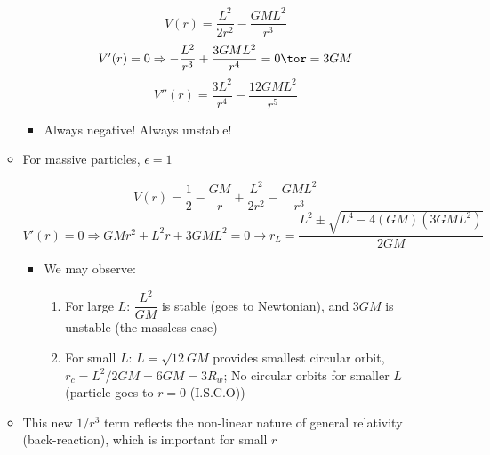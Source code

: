 \begin{itemize}
\begin{itemize}
        $$V(r)=\frac{L^2}{2r^2}-\frac{GML^2}{r^3}$$
        $$V'(r)=0\Rightarrow-\frac{L^2}{r^3}+\frac{3GML^2}{r^4}=0\tor=3GM$$
        $$V''(r)=\frac{3L^2}{r^4}-\frac{12GML^2}{r^5}$$

        \begin{itemize}

          \item Always negative! Always unstable!

        \end{itemize}

      \item For massive particles, $\epsilon=1$

        $$V(r)=\frac{1}{2}-\frac{GM}{r}+\frac{L^2}{2r^2}-\frac{GML^2}{r^3}$$
        $$V'(r)=0\Rightarrow GMr^2+L^2r+3GML^2=0\to r_L=\frac{L^2\pm\sqrt{L^4-4(GM)(3GML^2)}}{2GM}$$

        \begin{itemize}

          \item We may observe:

            \begin{enumerate}

              \item For large $L$: $\dfrac{L^2}{GM}$ is stable (goes to Newtonian), and $3GM$ is unstable (the massless case)

              \item For small $L$: $L=\sqrt{12}GM$ provides smallest circular orbit, $r_c=L^2/2GM=6GM=3R_w$; No circular orbits for smaller $L$ (particle goes to $r=0$ (I.S.C.O))

            \end{enumerate}

        \end{itemize}

      \item This new $1/r^3$ term reflects the non-linear nature of general relativity (back-reaction), which is important for small $r$

    \end{itemize}

\end{itemize}



